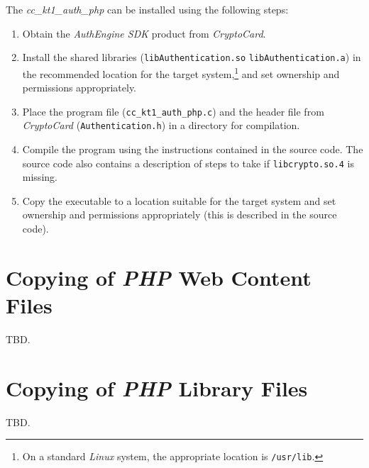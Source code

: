 The \emph{cc\_kt1\_auth\_php} can be installed using the following steps:

\begin{enumerate}
\item Obtain the \emph{AuthEngine SDK} product from \emph{CryptoCard}.
\item Install the shared libraries (\texttt{libAuthentication.so}
      \texttt{libAuthentication.a}) in the recommended location for
      the target system,\footnote{On a standard \emph{Linux} system,
      the appropriate location is \texttt{/usr/lib}.}
      and set ownership and permissions appropriately.
\item Place the program file (\texttt{cc\_kt1\_auth\_php.c}) and
      the header file from \emph{CryptoCard} (\texttt{Authentication.h})
      in a directory for compilation.
\item Compile the program using the instructions contained in the source
      code.  The source code also contains a description of steps to
      take if \texttt{libcrypto.so.4} is missing.
\item Copy the executable to a location suitable for the target system and
      set ownership and permissions appropriately (this is described
      in the source code).
\end{enumerate}


\section{Copying of \emph{PHP} Web Content Files}
\label{cist0:swcf0}

TBD.


\section{Copying of \emph{PHP} Library Files}
\label{cist0:scph0}

TBD.


